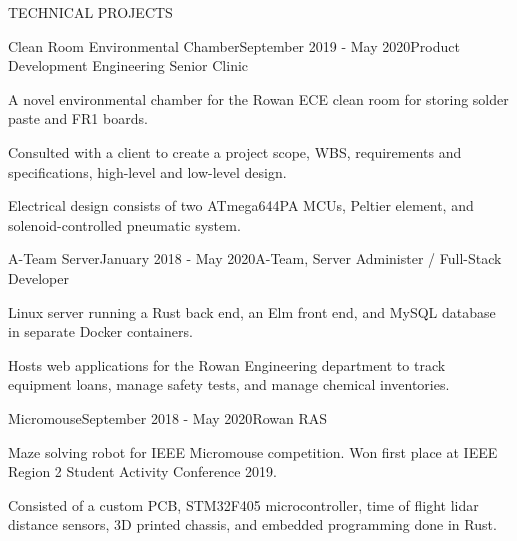 \documentclass{resume} %
\begin{document}
\begin{rSection}{TECHNICAL PROJECTS}

  \begin{rSubsection}{Clean Room Environmental Chamber}{September 2019 - May
    2020}{Product Development Engineering Senior Clinic}{}
  \item A novel environmental chamber for the Rowan ECE clean room for storing
    solder paste and FR1 boards.
  \item Consulted with a client to create a project scope, WBS, requirements and
    specifications, high-level and low-level design.
  \item Electrical design consists of two ATmega644PA MCUs, Peltier element, and
    solenoid-controlled pneumatic system.
  \end{rSubsection}


  \begin{rSubsection}{A-Team Server}{January 2018 - May 2020}{A-Team, Server
    Administer / Full-Stack Developer}{}
  \item Linux server running a Rust back end, an
    Elm front end, and MySQL database in separate Docker containers.
  \item Hosts web applications for the Rowan Engineering department to track equipment
    loans, manage safety tests, and manage chemical inventories.
  \end{rSubsection}




  \begin{rSubsection}{Micromouse}{September 2018 - May 2020}{Rowan RAS}{}
  \item Maze solving robot for IEEE Micromouse competition. Won first place at
    IEEE Region 2 Student Activity Conference 2019.
  \item Consisted of a custom PCB, STM32F405 microcontroller, time of flight lidar
    distance sensors, 3D printed chassis, and embedded programming done in Rust.
  \end{rSubsection}


\end{rSection}
\end{document}
